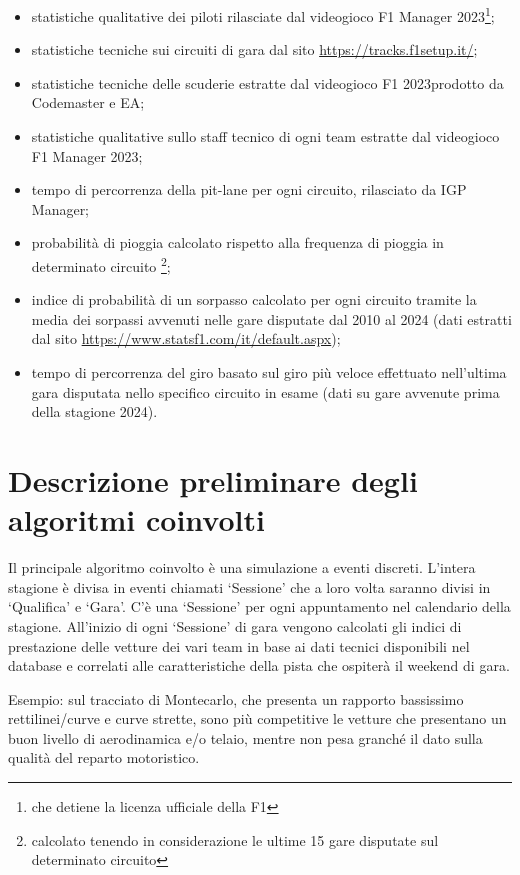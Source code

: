 \begin{itemize}
    \item statistiche qualitative dei piloti rilasciate dal videogioco F1 Manager 2023\footnote{che detiene la licenza ufficiale della F1};
    \item statistiche tecniche sui circuiti di gara dal sito \url{https://tracks.f1setup.it/};
    \item statistiche tecniche delle scuderie estratte dal videogioco F1 2023\footnotemark[1] prodotto da Codemaster e EA;
    \item statistiche qualitative sullo staff tecnico di ogni team estratte dal videogioco F1 Manager 2023\footnotemark[1];
    \item tempo di percorrenza della pit-lane per ogni circuito, rilasciato da IGP Manager;
    \item probabilità di pioggia calcolato rispetto alla frequenza di pioggia in determinato circuito \footnote{calcolato tenendo in considerazione le ultime 15 gare disputate sul determinato circuito};
    \item indice di probabilità di un sorpasso calcolato per ogni circuito tramite la media dei sorpassi avvenuti nelle gare disputate dal 2010 al 2024 (dati estratti dal sito \url{https://www.statsf1.com/it/default.aspx});
    \item tempo di percorrenza del giro basato sul giro più veloce effettuato nell’ultima gara disputata nello specifico circuito in esame (dati su gare avvenute prima della stagione 2024).
\end{itemize}

\section{Descrizione preliminare degli algoritmi coinvolti}
Il principale algoritmo coinvolto è una simulazione a eventi discreti.
L’intera stagione è divisa in eventi chiamati ‘Sessione’ che a loro volta saranno divisi in ‘Qualifica’ e ‘Gara’. C’è una ‘Sessione’ per ogni appuntamento nel calendario della stagione.
All’inizio di ogni ‘Sessione’ di gara vengono calcolati gli indici di prestazione delle vetture dei vari team in base ai dati tecnici disponibili nel database e correlati alle caratteristiche della pista che ospiterà il weekend di gara.

Esempio: sul tracciato di Montecarlo, che presenta un rapporto bassissimo rettilinei/curve e curve strette, sono più competitive le vetture che presentano un buon livello di aerodinamica e/o telaio, mentre non pesa granché il dato sulla qualità del reparto motoristico.


